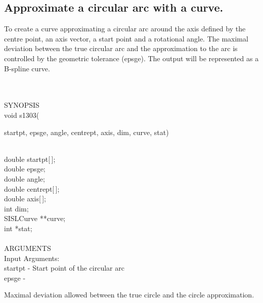\subsection{Approximate a circular arc with a curve.}
\begin{minipg1}
  To create a curve approximating a circular arc around
  the axis defined by the centre point, an axis vector,
  a start point and a rotational angle.
  The maximal deviation between the true circular arc and the
  approximation to the arc is controlled by the geometric
  tolerance (epsge).
  The output will be represented as a B-spline curve.
\end{minipg1} \\ \\
SYNOPSIS\\
        \>void s1303(\begin{minipg3}
                {\fov startpt}, {\fov epsge}, {\fov angle}, {\fov centrept}, {\fov axis}, {\fov dim},
                {\fov curve}, {\fov stat})
                \end{minipg3}\\[0.3ex]
                \>\>    double  \>      {\fov startpt}[\,];\\
                \>\>    double  \>      {\fov epsge};\\
                \>\>    double  \>      {\fov angle};\\
                \>\>    double  \>      {\fov centrept}[\,];\\
                \>\>    double  \>      {\fov axis}[\,];\\
                \>\>    int     \>      {\fov dim};\\
                \>\>    SISLCurve       \>      **{\fov curve};\\
                \>\>    int     \>      *{\fov stat};\\
\\
ARGUMENTS\\
        \>Input Arguments:\\
        \>\>    {\fov startpt}  \> - \> Start point of the circular arc\\
        \>\>    {\fov epsge}    \> - \> \begin{minipg2}
                                Maximal deviation allowed between the true
                                circle and the circle approximation.
                                \end{minipg2}\\[0.3ex]

